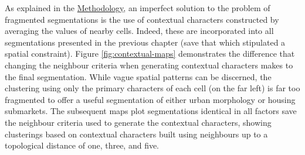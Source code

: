 \documentclass[a4paper, nobind]{templates/ociamthesis}
\begin{document}
As explained in the \protect\hyperlink{contextual-characters}{Methodology}, an imperfect solution to the problem of fragmented segmentations is the use of contextual characters constructed by averaging the values of nearby cells. Indeed, these are incorporated into all segmentations presented in the previous chapter (save that which stipulated a spatial constraint). Figure \ref{fig:contextual-maps} demonstrates the difference that changing the neighbour criteria when generating contextual characters makes to the final segmentation. While vague spatial patterns can be discerned, the clustering using only the primary characters of each cell (on the far left) is far too fragmented to offer a useful segmentation of either urban morphology or housing submarkets. The subsequent maps plot segmentations identical in all factors save the neighbour criteria used to generate the contextual characters, showing clusterings based on contextual characters built using neighbours up to a topological distance of one, three, and five.
\end{document}
